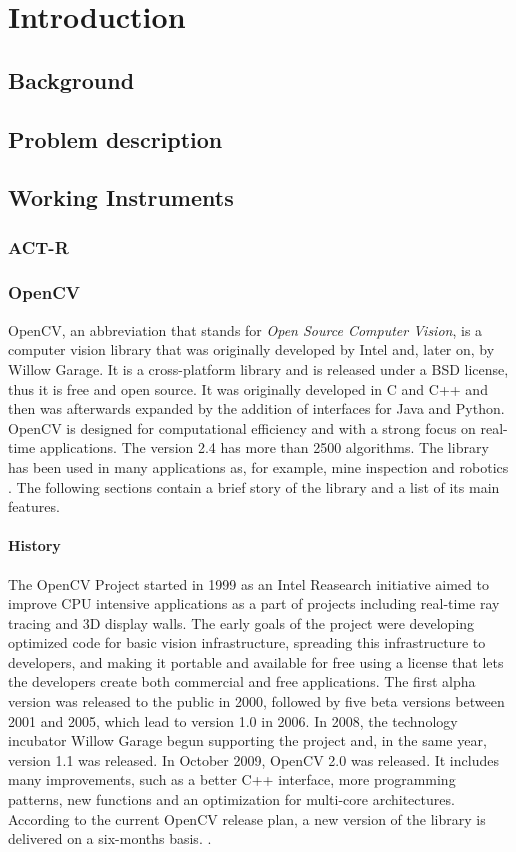 \chapter{Introduction}
\section{Background}
\section{Problem description}
\section{Working Instruments}
\subsection{ACT-R}
\subsection{OpenCV}
	OpenCV, an abbreviation that stands for \emph{Open Source Computer Vision}, is a computer vision library that was originally developed by Intel and, later on, by Willow Garage.
	It is a cross-platform library and is released under a BSD license, thus it is free and open source. It was originally developed in C and C++ and then was afterwards expanded by the addition of interfaces for Java and Python. OpenCV is designed for computational efficiency and with a strong focus on real-time applications. The version 2.4 has more than 2500 algorithms. The library has been used in many applications as, for example, mine inspection and robotics \cite{OpenCV:MainWebPage}. The following sections contain a brief story of the library and a list of its main features.
		
	\subsubsection*{History}
	The OpenCV Project started in 1999 as an Intel Reasearch initiative aimed to improve CPU intensive applications as a part of projects including real-time ray tracing and 3D display walls. The early goals of the project were developing optimized code for basic vision infrastructure, spreading this infrastructure to developers, and making it portable and available for free using a license that lets the developers create both commercial and free applications.
	The first alpha version was released to the public in 2000, followed by five beta versions between 2001 and 2005, which lead to version 1.0 in 2006. In 2008, the technology incubator Willow Garage begun supporting the project and, in the same year, version 1.1  was released. 
	In October 2009, OpenCV 2.0 was released. It includes many improvements, such as a better C++ interface, more programming patterns, new functions and an optimization for multi-core architectures. According to the current OpenCV release plan, a new version of the library is delivered on a six-months basis. \cite{OpenCV:ChangeLogs}.
	
